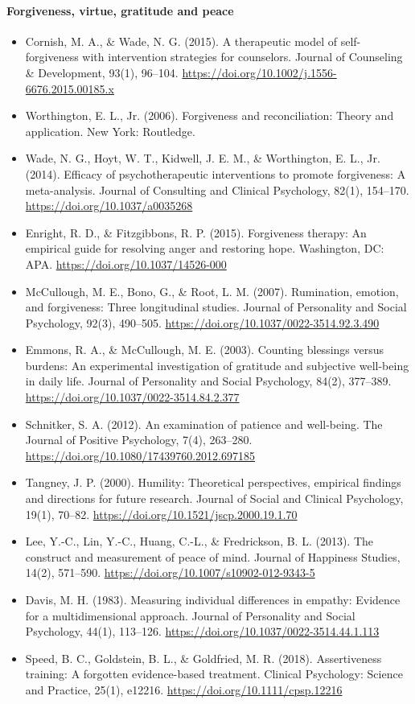 \documentclass[10pt]{article}
\theoremstyle{remark}
\begin{document}
\paragraph{Forgiveness, virtue, gratitude and peace}
\begin{itemize}[leftmargin=1em,itemsep=0pt,topsep=1pt,parsep=0pt]
\item Cornish, M. A., \& Wade, N. G. (2015). A therapeutic model of self-forgiveness with intervention strategies for counselors. Journal of Counseling \& Development, 93(1), 96--104. \url{https://doi.org/10.1002/j.1556-6676.2015.00185.x}
\item Worthington, E. L., Jr. (2006). Forgiveness and reconciliation: Theory and application. New York: Routledge.
\item Wade, N. G., Hoyt, W. T., Kidwell, J. E. M., \& Worthington, E. L., Jr. (2014). Efficacy of psychotherapeutic interventions to promote forgiveness: A meta-analysis. Journal of Consulting and Clinical Psychology, 82(1), 154--170. \url{https://doi.org/10.1037/a0035268}
\item Enright, R. D., \& Fitzgibbons, R. P. (2015). Forgiveness therapy: An empirical guide for resolving anger and restoring hope. Washington, DC: APA. \url{https://doi.org/10.1037/14526-000}
\item McCullough, M. E., Bono, G., \& Root, L. M. (2007). Rumination, emotion, and forgiveness: Three longitudinal studies. Journal of Personality and Social Psychology, 92(3), 490--505. \url{https://doi.org/10.1037/0022-3514.92.3.490}
\item Emmons, R. A., \& McCullough, M. E. (2003). Counting blessings versus burdens: An experimental investigation of gratitude and subjective well-being in daily life. Journal of Personality and Social Psychology, 84(2), 377--389. \url{https://doi.org/10.1037/0022-3514.84.2.377}
\item Schnitker, S. A. (2012). An examination of patience and well-being. The Journal of Positive Psychology, 7(4), 263--280. \url{https://doi.org/10.1080/17439760.2012.697185}
\item Tangney, J. P. (2000). Humility: Theoretical perspectives, empirical findings and directions for future research. Journal of Social and Clinical Psychology, 19(1), 70--82. \url{https://doi.org/10.1521/jscp.2000.19.1.70}
\item Lee, Y.-C., Lin, Y.-C., Huang, C.-L., \& Fredrickson, B. L. (2013). The construct and measurement of peace of mind. Journal of Happiness Studies, 14(2), 571--590. \url{https://doi.org/10.1007/s10902-012-9343-5}
\item Davis, M. H. (1983). Measuring individual differences in empathy: Evidence for a multidimensional approach. Journal of Personality and Social Psychology, 44(1), 113--126. \url{https://doi.org/10.1037/0022-3514.44.1.113}
\item Speed, B. C., Goldstein, B. L., \& Goldfried, M. R. (2018). Assertiveness training: A forgotten evidence-based treatment. Clinical Psychology: Science and Practice, 25(1), e12216. \url{https://doi.org/10.1111/cpsp.12216}
\end{itemize}
\end{document}
